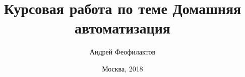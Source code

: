 \documentclass[12pt,a4paper]{article}
\author{Андрей Феофилактов}
\title{
    Курсовая работа \linebreak
    по теме \linebreak
    Домашняя автоматизация
}
\date{Москва, 2018}
\begin{document}
    \maketitle
    \pagebreak
    \tableofcontents
    

    
    
    
    
    
    
    

    
\end{document}
